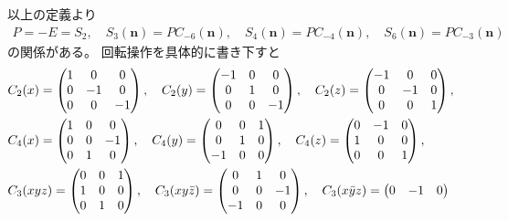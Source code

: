 \documentclass[11pt]{easymemo}
\begin{document}
以上の定義より
\begin{align}
  P=-E=S_{2},
  \quad
  S_{3}(\bm{n})=PC_{-6}(\bm{n}),
  \quad
  S_{4}(\bm{n})=PC_{-4}(\bm{n}),
  \quad
  S_{6}(\bm{n})=PC_{-3}(\bm{n})
\end{align}
の関係がある。
回転操作を具体的に書き下すと
\begin{align}
      &
  C_2(x)=\begin{pmatrix}
    1 & 0  & 0  \\
    0 & -1 & 0  \\
    0 & 0  & -1
  \end{pmatrix},
  \quad
  C_2(y)=\begin{pmatrix}
    -1 & 0 & 0  \\
    0  & 1 & 0  \\
    0  & 0 & -1
  \end{pmatrix},
  \quad
  C_2(z)=\begin{pmatrix}
    -1 & 0  & 0 \\
    0  & -1 & 0 \\
    0  & 0  & 1
  \end{pmatrix},
  \cr &
  C_4(x)=\begin{pmatrix}
    1 & 0 & 0  \\
    0 & 0 & -1 \\
    0 & 1 & 0
  \end{pmatrix},
  \quad
  C_4(y)=\begin{pmatrix}
    0  & 0 & 1 \\
    0  & 1 & 0 \\
    -1 & 0 & 0
  \end{pmatrix},
  \quad
  C_4(z)=\begin{pmatrix}
    0 & -1 & 0 \\
    1 & 0  & 0 \\
    0 & 0  & 1
  \end{pmatrix},
  \cr &
  C_3(xyz)=\begin{pmatrix}
    0 & 0 & 1 \\
    1 & 0 & 0 \\
    0 & 1 & 0
  \end{pmatrix},
  \quad
  C_3(xy\bar{z})=\begin{pmatrix}
    0  & 1 & 0  \\
    0  & 0 & -1 \\
    -1 & 0 & 0
  \end{pmatrix},
  \quad
  C_3(x\bar{y}z)=\begin{pmatrix}
    0 & -1 & 0  \\

\end{pmatrix}
\end{align}
\end{document}
